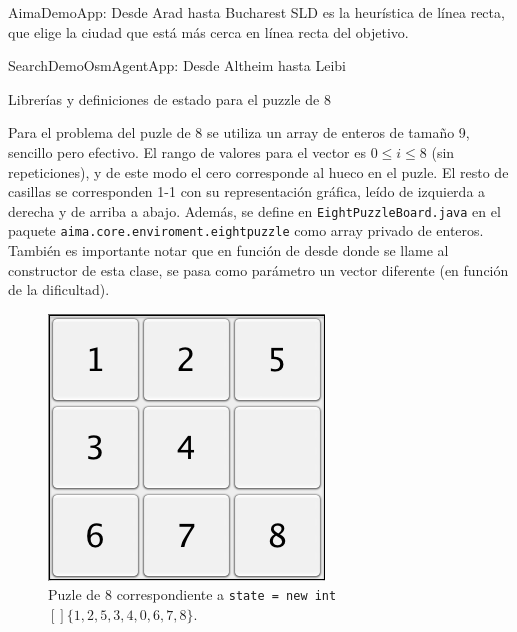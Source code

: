 \documentclass[11pt, a4paper, spanish, openright, twoside]{book}
\begin{document}
\begin{section}{AimaDemoApp: Desde Arad hasta Bucharest}
SLD es la heurística de línea recta, que elige la ciudad que está más cerca en línea recta del objetivo.

\end{section}


\begin{section}{SearchDemoOsmAgentApp: Desde Altheim hasta Leibi}


\end{section}


\begin{section}{Librerías y definiciones de estado para el puzzle de 8 }

Para el problema del puzle de 8 se utiliza un array de enteros de tamaño 9, sencillo pero efectivo. El rango de valores para el vector es $0\le i \le 8$ (sin repeticiones), y de este modo el cero corresponde al hueco en el puzle. El resto de casillas se corresponden 1-1 con su representación gráfica, leído de izquierda a derecha y de arriba a abajo. Además, se define en \texttt{EightPuzzleBoard.java} en el paquete \texttt{aima.core.enviroment.eightpuzzle} como array privado de enteros. También es importante notar que en función de desde donde se llame al constructor de esta clase, se pasa como parámetro un vector diferente (en función de la dificultad). 

\begin{figure}[!h]
		\begin{center}
			\includegraphics[scale=0.65]{puzle8}
			\caption{Puzle de 8 correspondiente a \texttt{state = new int$[] \{ 1, 2, 5, 3, 4, 0, 6, 7, 8 \}$}.}
		\end{center}
	\end{figure}
\end{section}
\end{document}

